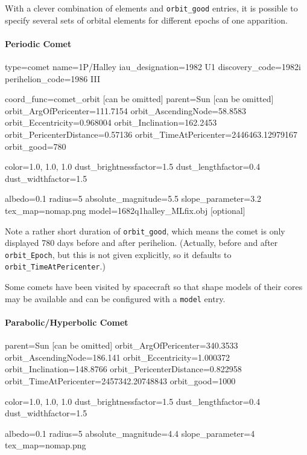 With a clever combination of elements and \texttt{orbit\_good}
entries,  it is possible to specify several sets of
orbital elements for different epochs of one apparition.

\paragraph{Periodic Comet}
\label{sec:ssystem.ini:Comet:Periodic}

\begin{configfile}
[1phalley]
type=comet  
name=1P/Halley
iau_designation=1982 U1
discovery_code=1982i
perihelion_code=1986 III

coord_func=comet_orbit [can be omitted]
parent=Sun [can be omitted]
orbit_ArgOfPericenter=111.7154
orbit_AscendingNode=58.8583
orbit_Eccentricity=0.968004
orbit_Inclination=162.2453
orbit_PericenterDistance=0.57136
orbit_TimeAtPericenter=2446463.12979167
orbit_good=780

color=1.0, 1.0, 1.0
dust_brightnessfactor=1.5
dust_lengthfactor=0.4
dust_widthfactor=1.5

albedo=0.1
radius=5
absolute_magnitude=5.5
slope_parameter=3.2
tex_map=nomap.png
model=1682q1halley_MLfix.obj [optional]
\end{configfile}

Note a rather short duration of
\texttt{orbit\_good}, which means the comet is only displayed 780 days
before and after perihelion. (Actually, before and after
\texttt{orbit\_Epoch}, but this is not given explicitly, so it
defaults to \texttt{orbit\_TimeAtPericenter}.)

Some comets have been visited by spacecraft so that shape models of their cores 
may be available and can be configured with a \texttt{model} entry.

\paragraph{Parabolic/Hyperbolic Comet}
\label{sec:ssystem.ini:Comet:Parabolic}

\begin{configfile}
parent=Sun [can be omitted]
orbit_ArgOfPericenter=340.3533
orbit_AscendingNode=186.141
orbit_Eccentricity=1.000372
orbit_Inclination=148.8766
orbit_PericenterDistance=0.822958
orbit_TimeAtPericenter=2457342.20748843
orbit_good=1000

color=1.0, 1.0, 1.0
dust_brightnessfactor=1.5
dust_lengthfactor=0.4
dust_widthfactor=1.5

albedo=0.1
radius=5
absolute_magnitude=4.4
slope_parameter=4
tex_map=nomap.png
\end{configfile}


